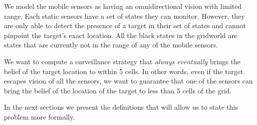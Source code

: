 We model the mobile sensors as having an omnidirectional vision with limited range. Each static sensors have a set of states they can monitor. However, they are only able to detect the presence of a target in their set of states and cannot pinpoint the target's exact location. All the black states in the gridworld are states that are currently not in the range of any of the mobile sensors. 

 We want to compute a surveillance strategy that \emph{always eventually} brings the belief of the target location to within 5 cells. In other words, even if the target escapes vision of all the sensors, we want to guarantee that one of the sensors can bring the belief of the location of the target to less than 5 cells of the grid. 

In the next sections we present the definitions that will allow us to state this problem more formally.